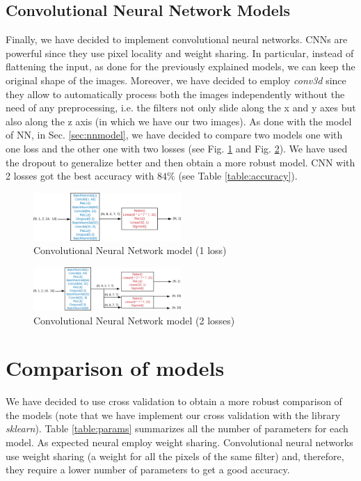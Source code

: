 \documentclass[journal, a4paper]{IEEEtran}
\begin{document}
\subsection{Convolutional Neural Network Models}
\label{sec:cnnmodel}
Finally, we have decided to implement convolutional neural networks. CNNs are powerful since they use pixel locality and weight sharing. In particular, instead of flattening the input, as done for the previously explained models, we can keep the original shape of the images. Moreover, we have decided to employ \textit{conv3d} since they allow to automatically process both the images independently without the need of any preprocessing, i.e. the filters not only slide along the x and y axes but also along the z axis (in which we have our two images). As done with the model of NN, in Sec. \ref{sec:nnmodel}, we have decided to compare two models one with one loss and the other one with two losses (see Fig. \ref{fig:cnn1} and Fig. \ref{fig:cnn2}). 
We have used the dropout to generalize better and then obtain a more robust model. CNN with 2 losses got the best accuracy with $84\%$  (see Table \ref{table:accuracy}).
\begin{figure}[!h]
    \centering
    \includegraphics[width=0.5\textwidth]{cnn1.png}
    \caption{Convolutional Neural Network model (1 loss)}
    \label{fig:cnn1}
\end{figure}
\begin{figure}[!h]
    \centering
    \includegraphics[width=0.5\textwidth]{cnn2.png}
    \caption{Convolutional Neural Network model (2 losses)}
    \label{fig:cnn2}
\end{figure}

\section{Comparison of models}
\label{sec:comparison}
We have decided to use cross validation to obtain a more robust comparison of the models (note that we have implement our cross validation with the library \textit{sklearn}).
Table \ref{table:params} summarizes all the number of parameters for each model. As expected neural employ weight sharing. Convolutional neural networks use weight sharing (a weight for all the pixels of the same filter) and, therefore, they require a lower number of parameters to get a good accuracy.
\end{document}
